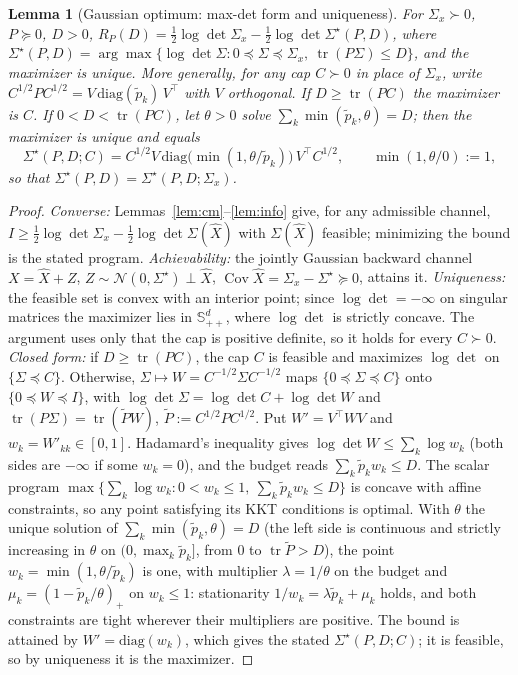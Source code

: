 \documentclass[11pt]{article}
\newtheorem{lemma}{Lemma}
\theoremstyle{definition}
\theoremstyle{remark}
\newcommand{\tr}{\operatorname{tr}}
\newcommand{\Cov}{\operatorname{Cov}}
\begin{document}
\begin{lemma}[Gaussian optimum: max-det form and uniqueness]\label{lem:maxdet}
For $\Sigma_x\succ0$, $P\succeq0$, $D>0$,
$R_P(D)=\tfrac12\log\det\Sigma_x-\tfrac12\log\det\Sigma^\star(P,D)$, where
$\Sigma^\star(P,D)=\arg\max\{\log\det\Sigma:0\preceq\Sigma\preceq\Sigma_x,\ \tr(P\Sigma)
\le D\}$, and the maximizer is unique. More generally, for any cap $C\succ0$ in place of
$\Sigma_x$, write $C^{1/2}PC^{1/2}=V\,\mathrm{diag}(\tilde p_k)\,V^\top$ with $V$
orthogonal. If $D\ge\tr(PC)$ the maximizer is $C$. If $0<D<\tr(PC)$, let $\theta>0$ solve
$\sum_k\min(\tilde p_k,\theta)=D$; then the maximizer is unique and equals
\[\Sigma^\star(P,D;C)=C^{1/2}V\,\mathrm{diag}\bigl(\min(1,\theta/\tilde p_k)\bigr)\,V^\top
C^{1/2},\qquad \min(1,\theta/0):=1,\]
so that $\Sigma^\star(P,D)=\Sigma^\star(P,D;\Sigma_x)$.
\end{lemma}
\begin{proof}
\emph{Converse:} Lemmas~\ref{lem:cm}--\ref{lem:info} give, for any admissible channel,
$I\ge\tfrac12\log\det\Sigma_x-\tfrac12\log\det\Sigma(\hat X)$ with $\Sigma(\hat X)$
feasible; minimizing the bound is the stated program. \emph{Achievability:} the jointly
Gaussian backward channel $X=\hat X+Z$, $Z\sim\mathcal N(0,\Sigma^\star)\perp\hat X$,
$\Cov\hat X=\Sigma_x-\Sigma^\star\succeq0$, attains it. \emph{Uniqueness:} the feasible
set is convex with an interior point; since $\log\det=-\infty$ on singular matrices the
maximizer lies in $\mathbb S^d_{++}$, where $\log\det$ is strictly concave. The argument
uses only that the cap is positive definite, so it holds for every $C\succ0$.
\emph{Closed form:} if $D\ge\tr(PC)$, the cap $C$ is feasible and maximizes $\log\det$ on
$\{\Sigma\preceq C\}$. Otherwise, $\Sigma\mapsto W=C^{-1/2}\Sigma C^{-1/2}$ maps
$\{0\preceq\Sigma\preceq C\}$ onto $\{0\preceq W\preceq I\}$, with $\log\det\Sigma=\log\det
C+\log\det W$ and $\tr(P\Sigma)=\tr(\tilde PW)$, $\tilde P:=C^{1/2}PC^{1/2}$. Put
$W'=V^\top WV$ and $w_k=W'_{kk}\in[0,1]$. Hadamard's inequality gives $\log\det W\le\sum_k
\log w_k$ (both sides are $-\infty$ if some $w_k=0$), and the budget reads
$\sum_k\tilde p_kw_k\le D$. The scalar program
$\max\{\sum_k\log w_k:0<w_k\le1,\ \sum_k\tilde p_kw_k\le D\}$ is concave with affine
constraints, so any point satisfying its KKT conditions is optimal. With $\theta$ the unique
solution of $\sum_k\min(\tilde p_k,\theta)=D$ (the left side is continuous and strictly
increasing in $\theta$ on $(0,\max_k\tilde p_k]$, from $0$ to $\tr\tilde P>D$), the point
$w_k=\min(1,\theta/\tilde p_k)$ is one, with multiplier $\lambda=1/\theta$ on the budget and
$\mu_k=(1-\tilde p_k/\theta)_+$ on $w_k\le1$: stationarity $1/w_k=\lambda\tilde p_k+\mu_k$
holds, and both constraints are tight wherever their multipliers are positive. The bound is
attained by $W'=\mathrm{diag}(w_k)$, which gives the stated $\Sigma^\star(P,D;C)$; it is
feasible, so by uniqueness it is the maximizer.
\end{proof}
\end{document}
